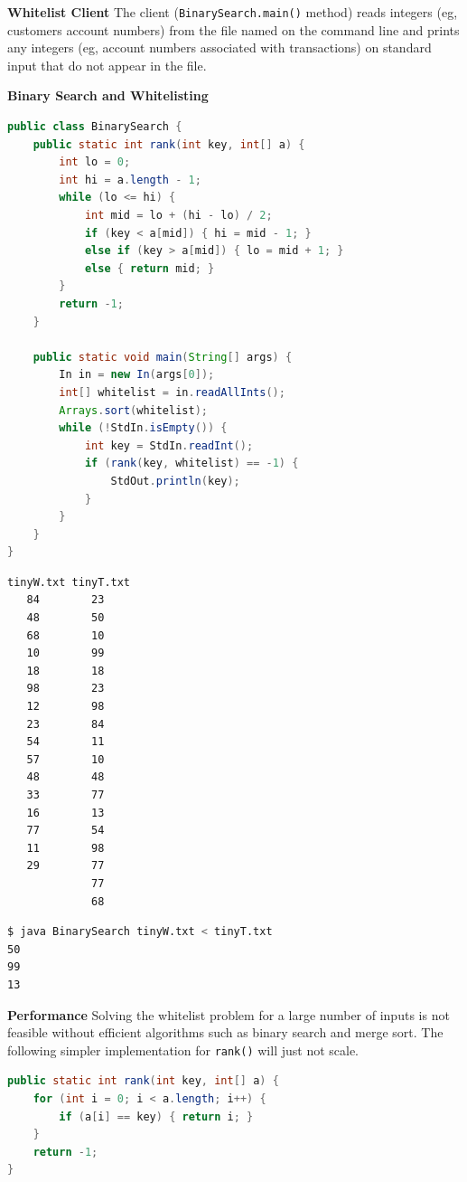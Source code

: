 \documentclass[8pt,a4paper,compress]{beamer}
\begin{document}
\begin{frame}[fragile]
\pause

\textbf{Whitelist Client} The client (\lstinline$BinarySearch.main()$ method) reads integers (eg, customers account numbers) from the file named on the command line and prints any integers (eg, account numbers associated with transactions) on standard input that do not appear in the file. 

\pause
\smallskip

\textbf{Binary Search and Whitelisting}

\begin{lstlisting}[language=Java]
public class BinarySearch {
    public static int rank(int key, int[] a) {
        int lo = 0;
        int hi = a.length - 1;
        while (lo <= hi) {
            int mid = lo + (hi - lo) / 2;
            if (key < a[mid]) { hi = mid - 1; }
            else if (key > a[mid]) { lo = mid + 1; }
            else { return mid; }
        }
        return -1;
    }

    public static void main(String[] args) {
        In in = new In(args[0]);
        int[] whitelist = in.readAllInts();
        Arrays.sort(whitelist);
        while (!StdIn.isEmpty()) {
            int key = StdIn.readInt();
            if (rank(key, whitelist) == -1) {
                StdOut.println(key);
            }
        }
    }
}
\end{lstlisting}
\end{frame}

\begin{frame}[fragile]
\pause

\begin{lstlisting}[language=bash]
tinyW.txt tinyT.txt
   84        23
   48        50
   68        10
   10        99
   18        18
   98        23
   12        98
   23        84
   54        11
   57        10
   48        48
   33        77
   16        13
   77        54
   11        98
   29        77
             77
             68
\end{lstlisting}

\pause

\begin{lstlisting}[language=bash]
$ java BinarySearch tinyW.txt < tinyT.txt
50
99
13
\end{lstlisting}

\pause
\smallskip

\textbf{Performance} Solving the whitelist problem for a large number of inputs is not feasible without efficient algorithms such as binary search and merge sort. The following simpler implementation for \lstinline$rank()$ will just not scale.

\begin{lstlisting}[language=Java]
public static int rank(int key, int[] a) {
    for (int i = 0; i < a.length; i++) {
        if (a[i] == key) { return i; }
    }
    return -1;
}
\end{lstlisting}
\end{frame}
\end{document}

